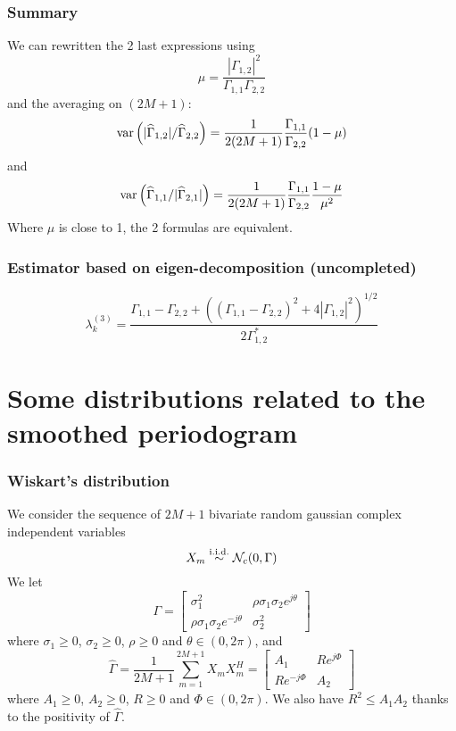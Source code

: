 \subsubsection{Summary}
We can rewritten the 2 last expressions using
$$
 \mu=\frac{|\Gamma_{1,2}|^{2}}{\Gamma_{1,1}\Gamma_{2,2}}
$$
and the averaging on $(2M+1)$:
\begin{eqnarray}
\label{eq:var12on22}
 \mathrm{var}\left( |\widehat\Gamma_{1,2}|/\widehat\Gamma_{2,2} \right) =\frac{1}{2(2M+1)}
   \frac{\Gamma_{1,1}}{\Gamma_{2,2}} (1-\mu)
\end{eqnarray} 
and
\begin{eqnarray}
\label{eq:var11on21}
 \mathrm{var}\left( \widehat\Gamma_{1,1}/|\widehat\Gamma_{2,1}| \right) 
  =\frac{1}{2(2M+1)}\frac{\Gamma_{1,1}}{\Gamma_{2,2}}
  \frac{1-\mu}{\mu^{2}}
\end{eqnarray} 
Where $\mu$ is close to 1, the 2 formulas are equivalent.
 \subsubsection{Estimator based on eigen-decomposition (uncompleted)}
$$
 \lambda_{k}^{(3)}
 = \frac{
 \Gamma_{1,1} -\Gamma_{2,2} + ((\Gamma_{1,1} - \Gamma_{2,2})^2 + 4|\Gamma_{1,2}|^{2})^{1/2}
 }{2\Gamma_{1,2}^{*}}
$$
\section{Some distributions related to the smoothed periodogram}
\subsubsection{Wiskart's distribution}

We consider the sequence of $2M+1$ bivariate random gaussian complex independent variables
$$
 X_{m}\stackrel{\mathrm{i.i.d.}}{\sim}\mathcal{N}_{c}(0,\Gamma)
$$
We let
$$
 \Gamma =
 \begin{bmatrix}
 \sigma_{1}^{2}&\rho \sigma_{1}\sigma_{2}e^{j\theta}
 \\
 \rho \sigma_{1}\sigma_{2}e^{-j\theta}&\sigma_{2}^{2}
 \end{bmatrix}
$$
where $\sigma_{1}\geq 0$, $\sigma_{2}\geq 0$, $\rho\geq 0$ and $\theta\in(0,2\pi)$, 
and
$$
 \hat\Gamma=\frac{1}{2M+1}\sum_{m=1}^{2M+1}X_{m}X_{m}^{H}=\begin{bmatrix}
 A_{1}%
 &
 R e^{j\Phi}%
 \\
 R e^{-j\Phi}%
 &
 A_{2}%
 \end{bmatrix}
$$
where $A_{1}\geq 0$, $A_{2}\geq 0$, $R\geq 0$ and $\Phi\in(0,2\pi)$. We also have $R^{2}\leq A_{1}A_{2}$ thanks to the positivity of $\hat\Gamma$.


